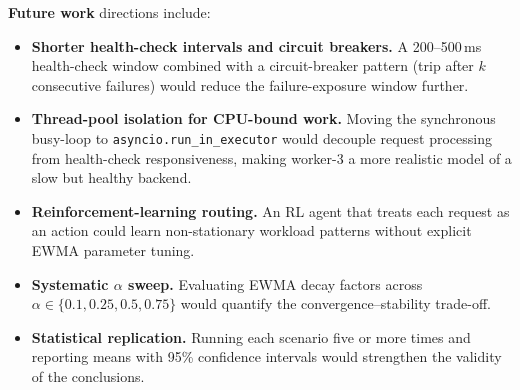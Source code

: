 \documentclass[conference]{IEEEtran}
\begin{document}
\textbf{Future work} directions include:
\begin{itemize}
    \item \textbf{Shorter health-check intervals and circuit breakers.}
    A 200--500\,ms health-check window combined with a circuit-breaker
    pattern (trip after $k$ consecutive failures) would reduce the
    failure-exposure window further.
    \item \textbf{Thread-pool isolation for CPU-bound work.} Moving
    the synchronous busy-loop to \texttt{asyncio.run\_in\_executor}
    would decouple request processing from health-check responsiveness,
    making worker-3 a more realistic model of a slow but healthy backend.
    \item \textbf{Reinforcement-learning routing.} An RL agent that
    treats each request as an action could learn non-stationary
    workload patterns without explicit EWMA parameter tuning.
    \item \textbf{Systematic $\alpha$ sweep.} Evaluating EWMA decay
    factors across $\alpha \in \{0.1, 0.25, 0.5, 0.75\}$ would
    quantify the convergence--stability trade-off.
    \item \textbf{Statistical replication.} Running each scenario five
    or more times and reporting means with 95\% confidence intervals
    would strengthen the validity of the conclusions.
\end{itemize}
\end{document}
